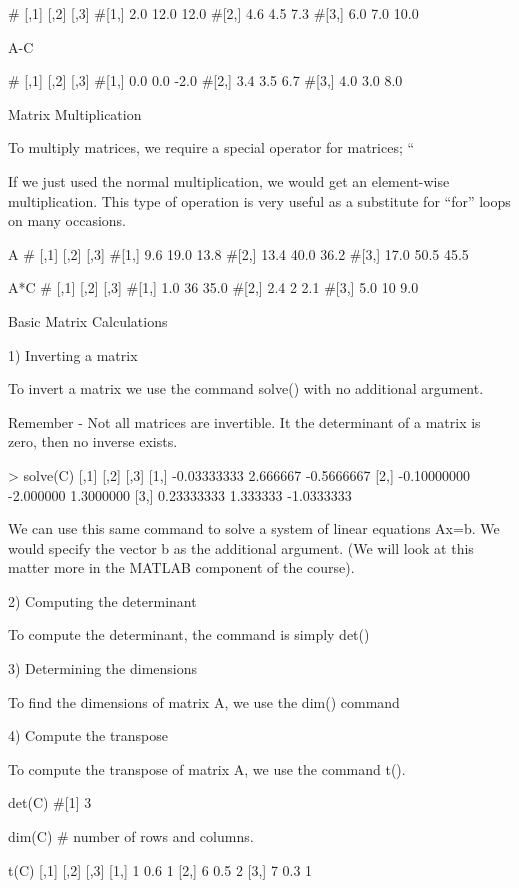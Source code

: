 #     [,1] [,2] [,3]
#[1,]  2.0 12.0 12.0
#[2,]  4.6  4.5  7.3
#[3,]  6.0  7.0 10.0
 
A-C

#     [,1] [,2] [,3]
#[1,]  0.0  0.0 -2.0
#[2,]  3.4  3.5  6.7
#[3,]  4.0  3.0  8.0

Matrix Multiplication

To multiply matrices, we require a special operator for matrices; “%

If we just used the normal multiplication, we would get an element-wise multiplication.
This type of operation is very useful as a substitute for “for” loops on many occasions.

 A %
#     [,1] [,2] [,3]
#[1,]  9.6 19.0 13.8
#[2,] 13.4 40.0 36.2
#[3,] 17.0 50.5 45.5

 A*C
#     [,1] [,2] [,3]
#[1,]  1.0   36 35.0
#[2,]  2.4    2  2.1
#[3,]  5.0   10  9.0



Basic Matrix Calculations

1) Inverting a matrix 

To invert a matrix we use the command solve() with no additional argument.

Remember - Not all matrices are invertible.  It the determinant of a matrix is zero, then no inverse exists.

> solve(C)
            [,1]      [,2]       [,3]
[1,] -0.03333333  2.666667 -0.5666667
[2,] -0.10000000 -2.000000  1.3000000
[3,]  0.23333333  1.333333 -1.0333333

We can use this same command to solve a system of linear equations Ax=b. We would specify the vector b as the additional argument.
(We will look at this matter more in the MATLAB component of the course).

2) Computing the determinant

To compute the determinant, the command is simply det()

3) Determining the dimensions 

To find the dimensions of matrix A, we use the dim() command 

4) Compute the transpose 

To compute the transpose of matrix A, we use the command t().


det(C)
#[1] 3

dim(C) # number of rows and columns.

t(C)
     [,1] [,2] [,3]
[1,]    1  0.6    1
[2,]    6  0.5    2
[3,]    7  0.3    1

